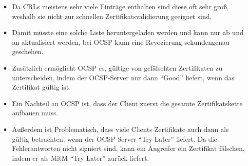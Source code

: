 \documentclass[a4paper, 11pt, accentcolor = tud3b]{tudreport}
\begin{document}
                \begin{itemize}
                	\item Da CRLs meistens sehr viele Einträge enthalten sind diese oft sehr groß, weshalb sie nicht zur schnellen Zertifikatsvalidierung geeignet sind.
                	\item Damit müsste eine solche Liste heruntergeladen werden und kann nur ab und an aktualisiert werden, bei OCSP kann eine Revozierung sekundengenau geschehen.
                	\item Zusätzlich ermöglicht OCSP es, gültige von gefälschten Zertifikaten zu unterscheiden, indem der OCSP-Server nur dann \enquote{Good} liefert, wenn das Zertifikat gültig ist.
                	\item Ein Nachteil an OCSP ist, dass der Client zuerst die gesamte Zertifikatskette aufbauen muss.
                	\item Außerdem ist Problematisch, dass viele Clients Zertifikate auch dann als gültig betrachten, wenn der OCSP-Server \enquote{Try Later} liefert. Da die Fehlerantworten nicht signiert sind, kann ein Angreifer ein Zertifikat fälschen, indem er als MitM \enquote{Try Later} zurück liefert.
                \end{itemize}
\end{document}
